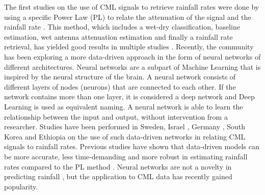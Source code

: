 \documentclass[twocolumn, 10pt, a4paper]{article}
\begin{document}
	The first studies on the use of CML signals to retrieve rainfall rates were done by using a specific Power Law (PL) to relate the attenuation of the signal and the rainfall rate . This method, which includes a wet-dry classification, baseline estimation, wet antenna attenuation estimation and finally a rainfall rate retrieval, has yielded good results in multiple studies . Recently, the community has been exploring a more data-driven approach in the form of neural networks of different architectures. Neural networks are a subpart of Machine Learning that is inspired by the neural structure of the brain. A neural network consists of different layers of nodes (neurons) that are connected to each other. If the network contains more than one layer, it is considered a deep network and Deep Learning is used as equivalent naming. A neural network is able to learn the relationship between the input and output, without intervention from a researcher. Studies have been performed in Sweden, Israel , Germany , South Korea and Ethiopia \cite{Diba2021} on the use of such data-driven networks in relating CML signals to rainfall rates. Previous studies have shown that data-driven models can be more accurate, less time-demanding and more robust in estimating rainfall rates compared to the PL method . Neural networks are not a novelty in predicting rainfall , but the application to CML data has recently gained popularity.
		
\end{document}
